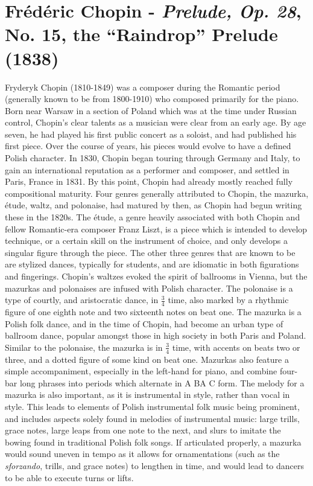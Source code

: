 \chapter[Chopin and Prelude, Op. 28, No. 15]{Frédéric Chopin - \textit{Prelude, Op. 28}, No. 15, the ``Raindrop'' Prelude (1838)}

Fryderyk Chopin (1810-1849) was a composer during the Romantic period (generally known to be from 1800-1910) who composed primarily for the piano. Born near Warsaw in a section of Poland which was at the time under Russian control, Chopin's clear talents as a musician were clear from an early age. By age seven, he had played his first public concert as a soloist, and had published his first piece. Over the course of years, his pieces would evolve to have a defined Polish character. In 1830, Chopin began touring through Germany and Italy, to gain an international reputation as a performer and composer, and settled in Paris, France in 1831. By this point, Chopin had already mostly reached fully compositional maturity. Four genres generally attributed to Chopin, the mazurka, étude, waltz, and polonaise, had matured by then, as Chopin had begun writing these in the 1820s\autocite{Burkholder_Grout_Palisca_2014}. The étude, a genre heavily associated with both Chopin and fellow Romantic-era composer Franz Liszt, is a piece which is intended to develop technique, or a certain skill on the instrument of choice, and only develops a singular figure through the piece. The other three genres that are known to be  are stylized dances, typically for students, and are idiomatic in both figurations and fingerings\autocite{Burkholder_Grout_Palisca_2014}. Chopin's waltzes evoked the spirit of ballrooms in Vienna, but the mazurkas and polonaises are infused with Polish character. The polonaise is a type of courtly, and aristocratic dance, in $\frac{3}{4}$ time, also marked by a rhythmic figure of one eighth note and two sixteenth notes on beat one. The mazurka is a Polish folk dance, and in the time of Chopin, had become an urban type of ballroom dance, popular amongst those in high society in both Paris and Poland. Similar to the polonaise, the mazurka is in $\frac{3}{4}$ time, with accents on beats two or three, and a dotted figure of some kind on beat one. Mazurkas also feature a simple accompaniment, especially in the left-hand for piano, and combine four-bar long phrases into periods which alternate in A BA C form. The melody for a mazurka is also important, as it is instrumental in style, rather than vocal in style. This leads to elements of Polish instrumental folk music being prominent, and includes aspects solely found in melodies of instrumental music: large trills, grace notes, large leaps from one note to the next, and slurs to imitate the bowing found in traditional Polish folk songs. If articulated properly, a mazurka would sound uneven in tempo as it allows for ornamentations (such as the \textit{sforzando}, trills, and grace notes) to lengthen in time, and would lead to dancers to be able to execute turns or lifts. 


